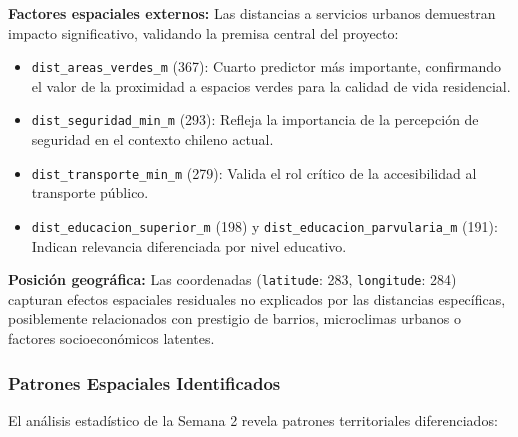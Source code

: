 \textbf{Factores espaciales externos:} Las distancias a servicios urbanos demuestran impacto significativo, validando la premisa central del proyecto:
\begin{itemize}
    \item \texttt{dist\_areas\_verdes\_m} (367): Cuarto predictor más importante, confirmando el valor de la proximidad a espacios verdes para la calidad de vida residencial.
    \item \texttt{dist\_seguridad\_min\_m} (293): Refleja la importancia de la percepción de seguridad en el contexto chileno actual.
    \item \texttt{dist\_transporte\_min\_m} (279): Valida el rol crítico de la accesibilidad al transporte público.
    \item \texttt{dist\_educacion\_superior\_m} (198) y \texttt{dist\_educacion\_parvularia\_m} (191): Indican relevancia diferenciada por nivel educativo.
\end{itemize}

\textbf{Posición geográfica:} Las coordenadas (\texttt{latitude}: 283, \texttt{longitude}: 284) capturan efectos espaciales residuales no explicados por las distancias específicas, posiblemente relacionados con prestigio de barrios, microclimas urbanos o factores socioeconómicos latentes.

\subsubsection{Patrones Espaciales Identificados}

El análisis estadístico de la Semana 2 revela patrones territoriales diferenciados:

